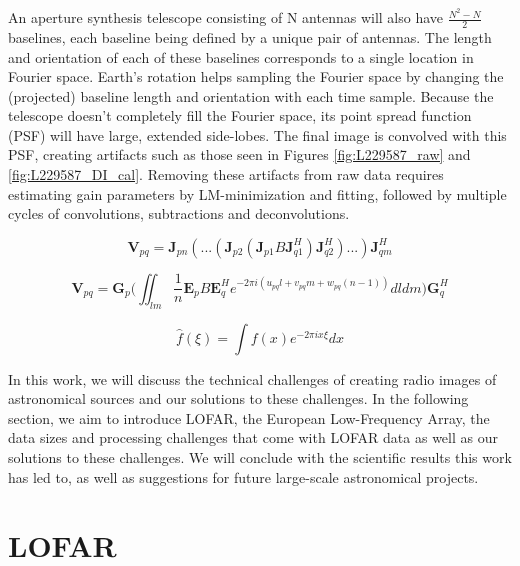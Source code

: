 An aperture synthesis telescope consisting of N antennas will also have $\frac{N^2 -N}{2}$ baselines, each baseline being defined by a unique pair of antennas. The length and orientation of each of these baselines corresponds to a single location in \Gls{Fourier space}. Earth's rotation helps sampling the Fourier space by changing the (projected) baseline length and orientation with each time sample\citep{christiansen1987radiotelescopes}. Because the telescope doesn't completely fill the Fourier space, its point spread function (PSF) will have large, extended side-lobes. The final image is convolved with this PSF, creating artifacts such as those seen in Figures \ref{fig:L229587_raw} and \ref{fig:L229587_DI_cal}. Removing these artifacts from raw data requires estimating gain parameters by LM-minimization and fitting\cite{prefactor3_gasperin}, followed by multiple cycles of convolutions, subtractions and deconvolutions\citep{Wendy_bootes, vanweeren2016, tasse2018}. 



\begin{equation}
    \bm{V}_{pq} = \bm{J}_{pn}(...(\bm{J}_{p2}(\bm{J}_{p1}B\bm{J}^H_{q1})\bm{J}^H_{q2})...)\bm{J}^H_{qm}
    \label{eq:RIME1}
\end{equation}


\begin{equation}
    \bm{V}_{pq} = \bm{G}_p \Bigg( \iint_{\mathit{lm}}\frac{1}{n} \bm{E}_p B \bm{E}^H_q e^{-2\pi i (u_{pq}l+v_{pq}m+w_{pq}(n-1))} d\mathit{l}d\mathit{m}\Bigg) \bm{G}^H_q
    \label{eq:RIME2}
\end{equation}


\begin{equation}
    \hat f(\xi) = \int f(x) e^{-2\pi i x \xi} dx 
    \label{eq:fourier}
\end{equation}

In this work, we will discuss the technical challenges of creating radio images of astronomical sources and our solutions to these challenges. In the following section, we aim to introduce LOFAR, the European Low-Frequency Array, the data sizes and processing challenges that come with LOFAR data as well as our solutions to these challenges. We will conclude with the scientific results this work has led to, as well as suggestions for future large-scale astronomical projects.

\section{LOFAR}

